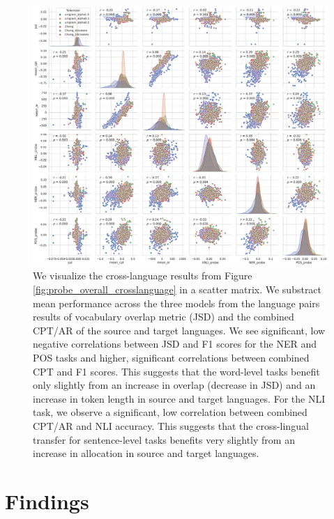 \begin{figure}
    \centering
    \includegraphics[width=\textwidth]{figures/probe_detailed_crosslanguage_scattermatrix.pdf}
    \caption{We visualize the cross-language results from Figure \ref{fig:probe_overall_crosslanguage} in a scatter matrix. We substract mean performance across the three models from the language pairs results of vocabulary overlap metric (JSD) and the combined CPT/AR of the source and target languages. We see significant, low negative correlations between JSD and F1 scores for the NER and POS tasks and higher, significant correlations between combined CPT and F1 scores. This suggests that the word-level tasks benefit only slightly from an increase in overlap (decrease in JSD) and an increase in token length in source and target languages. For the NLI task, we observe a significant, low correlation between combined CPT/AR and NLI accuracy. This suggests that the cross-lingual transfer for sentence-level tasks benefits very slightly from an increase in allocation in source and target languages.}
    \label{fig:probe_overall_crosslanguage_scattermatrix}
\end{figure}

\section{Findings}


